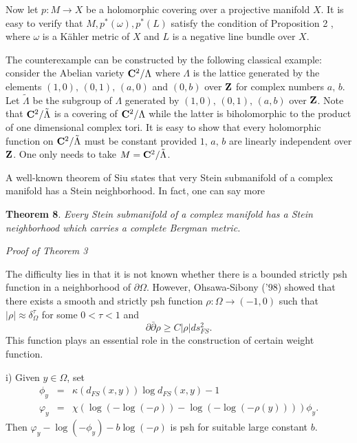 \documentclass[12pt]{article}
\begin{document}
\bigskip

Now let $p:M\rightarrow X$ be a holomorphic covering over a
projective manifold $X$. It is easy to verify that
$M,p^\ast(\omega),p^\ast(L)$ satisfy the condition of Proposition
2 , where $\omega$ is a K\"ahler metric of $X$ and $L$ is a
negative line bundle over $X$.

The counterexample can be constructed by the following classical
example: consider the Abelian variety ${\bf C}^2/\Lambda$ where
$\Lambda$ is the lattice generated by the elements
$(1,0),\,(0,1),\,(a,0)$ and $(0,b)$ over ${\bf Z}$ for complex
numbers $a,\,b$. Let $\tilde{\Lambda}$ be the subgroup of
$\Lambda$ generated by $(1,0),\,(0,1),\,(a,b)$ over ${\bf Z}$.
Note that ${\bf C}^2/\tilde{\Lambda}$ is a covering of ${\bf
C}^2/\Lambda$ while the latter is biholomorphic to the product of
one dimensional complex tori. It is easy to show that every
holomorphic function on ${\bf C}^2/\tilde{\Lambda}$ must be
constant provided $1,\,a,\,b$ are linearly independent over ${\bf
Z}$. One only needs to take $M={\bf C}^2/\tilde{\Lambda}$.

\bigskip

A well-known theorem of Siu states that very Stein submanifold of
a complex manifold has a Stein neighborhood. In fact, one can say
more

\bigskip

\textbf{Theorem 8}. \emph{Every Stein submanifold of a complex
manifold has a Stein neighborhood which carries a complete Bergman
metric.}

\bigskip

\emph{Proof of Theorem 3}

\bigskip

The difficulty lies in that it is not known whether there is a
bounded strictly psh function in a neighborhood of $\partial
\Omega$. However, Ohsawa-Sibony ('98) showed that there exists a
smooth and strictly psh function $\rho:\Omega\rightarrow (-1,0)$
such that $|\rho|\approx \delta^\tau_\Omega$ for some $0<\tau< 1$
and
$$
\partial\bar{\partial}\rho\ge C |\rho| ds^2_{FS}.
$$
This function plays an essential role in the construction of
certain weight function.

\bigskip

i) Given $y\in \Omega$, set
\begin{eqnarray*}
\phi_y & = & \kappa(d_{FS}(x,y))\log d_{FS}(x,y)-1\\
 \varphi _y & =
& \chi \left( \log (-\log (-\rho ))-\log (-\log (-\rho
(y)))\right)\phi_y.
\end{eqnarray*}
Then $\varphi _y-\log (-\phi_y)-b\log (-\rho )$ is psh for
suitable large constant $b$.
\end{document}
